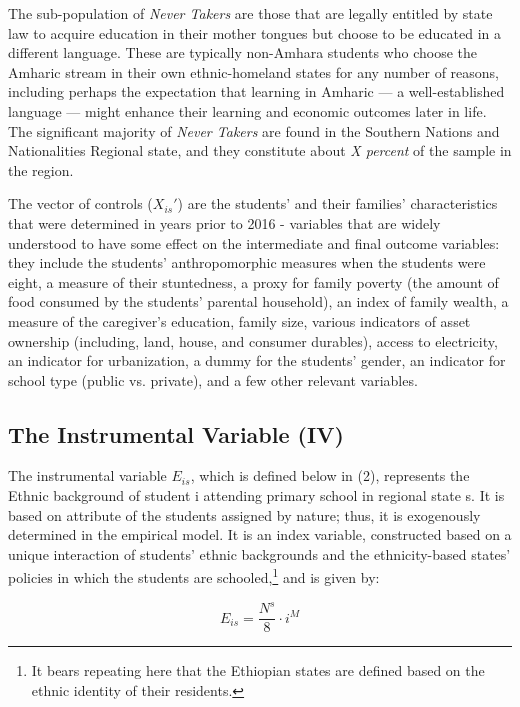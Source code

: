 The sub-population of \textit{Never Takers} are those that are legally entitled by state law to acquire education in their mother tongues but choose to be educated in a different language. These are typically non-Amhara students who choose the Amharic stream in their own ethnic-homeland states for any number of reasons, including perhaps the expectation that learning in Amharic --- a well-established language --- might enhance their learning and economic outcomes later in life. The significant majority of \textit{Never Takers} are found in the Southern Nations and Nationalities Regional state, and they constitute about \textit{X percent} of the sample in the region.

The vector of controls ($ X_{is}' $) are the students’ and their families’ characteristics that were determined in years prior to 2016 - variables that are widely understood to have some effect on the intermediate and final outcome variables: they include the students’ anthropomorphic measures when the students were eight, a measure of their stuntedness, a proxy for family poverty (the amount of food consumed by the students’ parental household), an index of family wealth, a measure of the caregiver’s education, family size, various indicators of asset ownership (including, land, house, and consumer durables), access to electricity, an indicator for urbanization, a dummy for the students’ gender, an indicator for school type (public vs. private), and a few other relevant variables. 

\subsection{The Instrumental Variable (IV)}

The instrumental variable $ E_{is} $, which is defined below in (2), represents the Ethnic background of student i attending primary school in regional state s. It is based on attribute of the students assigned by nature; thus, it is exogenously determined in the empirical model. It is an index variable, constructed based on a unique interaction of students’ ethnic backgrounds and the ethnicity-based states’ policies in which the students are schooled,\footnote{It bears repeating here that the Ethiopian states are defined based on the ethnic identity of their residents.} and is given by:

\begin{equation}\label{eq:02}
	E_{is} = \frac{N^{s}}{8}\cdot i^{M}
\end{equation}

